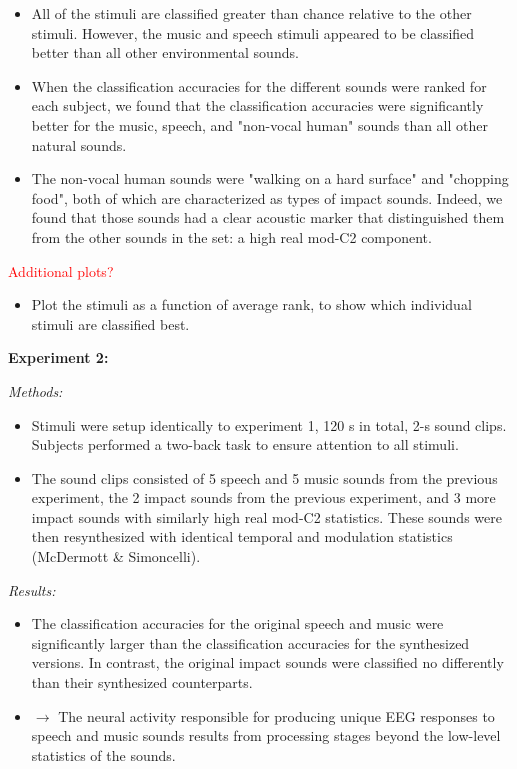 \documentclass[11pt]{article}
\begin{document}
\begin{itemize}
\item All of the stimuli are classified greater than chance relative to the other stimuli.  However, the music and speech stimuli appeared to be classified better than all other environmental sounds.
\item When the classification accuracies for the different sounds were ranked for each subject, we found that the classification accuracies were significantly better for the music, speech, and "non-vocal human" sounds than all other natural sounds.
\item The non-vocal human sounds were "walking on a hard surface" and "chopping food", both of which are characterized as types of impact sounds.  Indeed, we found that those sounds had a clear acoustic marker that distinguished them from the other sounds in the set: a high real mod-C2 component.
\end{itemize}

\textcolor{red}{Additional plots?}

\begin{itemize}
\item Plot the stimuli as a function of average rank, to show which individual stimuli are classified best.
\end{itemize}

\textbf{Experiment 2:}

\textit{Methods:}

\begin{itemize}
\item Stimuli were setup identically to experiment 1, 120 s in total, 2-s sound clips.  Subjects performed a two-back task to ensure attention to all stimuli.
\item The sound clips consisted of 5 speech and 5 music sounds from the previous experiment, the 2 impact sounds from the previous experiment, and 3 more impact sounds with similarly high real mod-C2 statistics.  These sounds were then resynthesized with identical temporal and modulation statistics (McDermott & Simoncelli).
\end{itemize}

\textit{Results:}

\begin{itemize}
\item The classification accuracies for the original speech and music were significantly larger than the classification accuracies for the synthesized versions.  In contrast, the original impact sounds were classified no differently than their synthesized counterparts.
\item $\rightarrow$ The neural activity responsible for producing unique EEG responses to speech and music sounds results from processing stages beyond the low-level statistics of the sounds.
\end{itemize}
\end{document}
